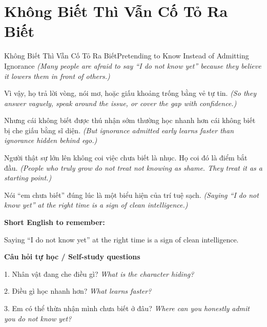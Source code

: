 \section{Không Biết Thì Vẫn Cố Tỏ Ra Biết}
\begin{truyen}{Không Biết Thì Vẫn Cố Tỏ Ra Biết}{Pretending to Know Instead of Admitting Ignorance}
\textit{(Many people are afraid to say “I do not know yet” because they believe it lowers them in front of others.)}

Vì vậy, họ trả lời vòng, nói mơ, hoặc giấu khoảng trống bằng vẻ tự tin.
\textit{(So they answer vaguely, speak around the issue, or cover the gap with confidence.)}

Nhưng cái không biết được thú nhận sớm thường học nhanh hơn cái không biết bị che giấu bằng sĩ diện.
\textit{(But ignorance admitted early learns faster than ignorance hidden behind ego.)}

Người thật sự lớn lên không coi việc chưa biết là nhục. Họ coi đó là điểm bắt đầu.
\textit{(People who truly grow do not treat not knowing as shame. They treat it as a starting point.)}

\end{truyen}

\begin{baihoc}
Nói “em chưa biết” đúng lúc là một biểu hiện của trí tuệ sạch.
\textit{(Saying “I do not know yet” at the right time is a sign of clean intelligence.)}
\end{baihoc}

\begin{ghinhoanh}
\textbf{Short English to remember:}

Saying “I do not know yet” at the right time is a sign of clean intelligence.

\end{ghinhoanh}

\begin{tuhocnhanh}
\textbf{Câu hỏi tự học / Self-study questions}

1. Nhân vật đang che điều gì? \textit{What is the character hiding?}

2. Điều gì học nhanh hơn? \textit{What learns faster?}

3. Em có thể thừa nhận mình chưa biết ở đâu? \textit{Where can you honestly admit you do not know yet?}
\end{tuhocnhanh}
\ngancach


